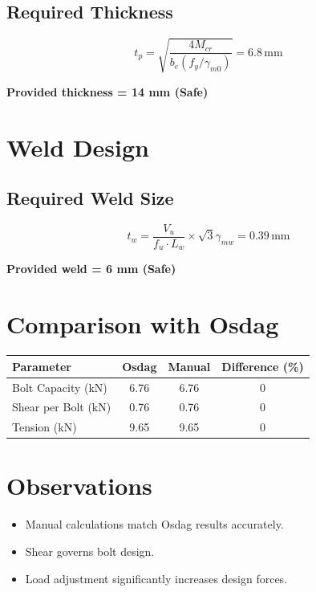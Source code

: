 \subsection{Required Thickness}

\begin{equation}
t_p = \sqrt{\frac{4M_{cr}}{b_e (f_y/\gamma_{m0})}} = 6.8 \, \text{mm}
\end{equation}

\textbf{Provided thickness = 14 mm (Safe)}

\section{Weld Design}

\subsection{Required Weld Size}

\begin{equation}
t_w = \frac{V_u}{f_u \cdot L_w} \times \sqrt{3} \gamma_{mw} = 0.39 \, \text{mm}
\end{equation}

\textbf{Provided weld = 6 mm (Safe)}

\section{Comparison with Osdag}

\begin{center}
\begin{tabular}{lccc}
\toprule
Parameter & Osdag & Manual & Difference (\%) \\
\midrule
Bolt Capacity (kN) & 6.76 & 6.76 & 0 \\
Shear per Bolt (kN) & 0.76 & 0.76 & 0 \\
Tension (kN) & 9.65 & 9.65 & 0 \\
\bottomrule
\end{tabular}
\end{center}

\section{Observations}
\begin{itemize}
    \item Manual calculations match Osdag results accurately.
    \item Shear governs bolt design.
    \item Load adjustment significantly increases design forces.
\end{itemize}

